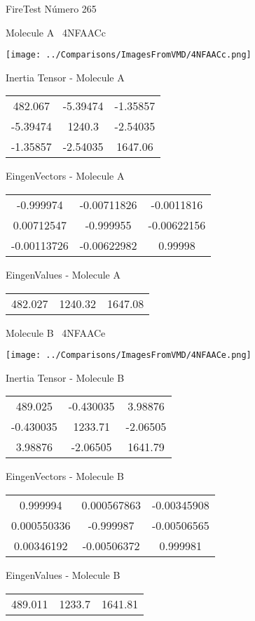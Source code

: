 \vtab[-3cm]
\begin{center}
{\large FireTest \tab Número 265}
\end{center}
\begin{multicols}{2}
\begin{center}

Molecule A \
4NFAACc

\texttt{[image: ../Comparisons/ImagesFromVMD/4NFAACc.png]}

Inertia Tensor - Molecule A \\
\begin{tabular}{|c c c|}
482.067	 & 	-5.39474	 & 	-1.35857	 \\
-5.39474	 & 	1240.3	 & 	-2.54035	 \\
-1.35857	 & 	-2.54035	 & 	1647.06
\end{tabular}

\vtab
 EingenVectors - Molecule A     \\
\begin{tabular}{|c c c|}
-0.999974	 & 	-0.00711826	 & 	-0.0011816	 \\
0.00712547	 & 	-0.999955	 & 	-0.00622156	 \\
-0.00113726	 & 	-0.00622982	 & 	0.99998
\end{tabular}

\vtab
 EingenValues - Molecule A     \\
\begin{tabular}{|c c c|}
482.027	 & 	1240.32	 & 	1647.08	 \\
\end{tabular}
\columnbreak

Molecule B \
4NFAACe

\texttt{[image: ../Comparisons/ImagesFromVMD/4NFAACe.png]}

Inertia Tensor - Molecule B \\
\begin{tabular}{|c c c|}
489.025	 & 	-0.430035	 & 	3.98876	 \\
-0.430035	 & 	1233.71	 & 	-2.06505	 \\
3.98876	 & 	-2.06505	 & 	1641.79
\end{tabular}

\vtab
 EingenVectors - Molecule B     \\
\begin{tabular}{|c c c|}
0.999994	 & 	0.000567863	 & 	-0.00345908	 \\
0.000550336	 & 	-0.999987	 & 	-0.00506565	 \\
0.00346192	 & 	-0.00506372	 & 	0.999981
\end{tabular}

\vtab
 EingenValues - Molecule B     \\
\begin{tabular}{|c c c|}
489.011	 & 	1233.7	 & 	1641.81	 \\
\end{tabular}

\end{center}
\end{multicols}

